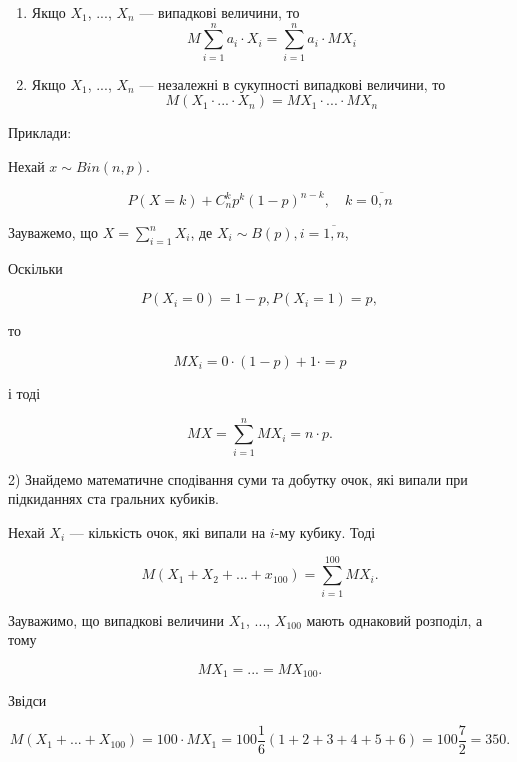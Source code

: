 \begin{remark}
    \begin{enumerate}
        \item Якщо $X_1$, ..., $X_n$ --- випадкові величини, то
            \begin{equation}
                M \sum\limits_{i=1}^{n} a_i \cdot X_i = \sum\limits_{i=1}^{n} a_i \cdot MX_i
            \end{equation}
        \item Якщо $X_1$, ..., $X_n$ --- незалежні в сукупності
            випадкові величини, то
            \begin{equation}
                M(X_1 \cdot ... \cdot X_n) = MX_1 \cdot ... \cdot MX_n
            \end{equation}
    \end{enumerate}
\end{remark}


Приклади:
\begin{example}
    Нехай $x \sim Bin(n, p)$.
    
    $$P(X=k) + C_n^k p^k (1-p)^{n-k}, \quad k =\overline{0, n}$$
    
    Зауважемо, що $X = \sum\limits_{i=1}^{n} X_i$,
    де $X_i \sim B(p), i = \overline{1, n}$, 
    
    Оскільки
    
    $$P(X_i=0) = 1-p, P(X_i=1) = p,$$
    
    то
    
    $$MX_i = 0 \cdot (1-p) + 1 \cdotp = p$$
    
    і тоді 
    
    $$MX = \sum\limits_{i=1}^{n} MX_i = n \cdot p.$$
\end{example}

\begin{example}
\end{example}
2) Знайдемо математичне сподівання суми та добутку
очок, які випали при підкиданнях ста гральних кубиків.

Нехай $X_i$ --- кількість очок, які випали на $i$-му кубику.
Тоді

$$M(X_1 + X_2 + ... + x_100)
= \sum\limits_{i=1}^{100} MX_i.$$

Зауважимо, що випадкові величини $X_1$, ..., $X_{100}$ мають однаковий
розподіл, а тому 

$$MX_1 = ... = MX_{100}.$$

Звідси 

$$M(X_1 + ... + X_{100})
= 100 \cdot MX_1
= 100 \frac{1}{6} (1 + 2 + 3 + 4 + 5 + 6)
= 100 \frac{7}{2}
= 350.$$

